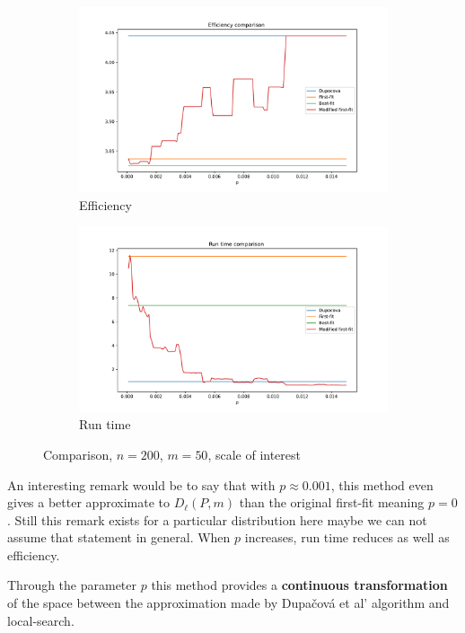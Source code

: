 \documentclass{amsart}
\begin{document}
\begin{figure}[ht]
    \centering
    \begin{subfigure}[b]{0.45\textwidth}
        \centering
        \includegraphics[width=1.1\textwidth]{plots/efficiency small scale p.pdf}
        \caption{Efficiency}
    \end{subfigure}
    \hfill
    \begin{subfigure}[b]{0.45\textwidth}
        \centering
        \includegraphics[width=1.1\textwidth]{plots/RUN TIME p small scale.pdf}
        \caption{Run time}
    \end{subfigure}
    \caption{Comparison, $n=200$, $m=50$, scale of interest}
    \label{p small scale}
\end{figure}

An interesting remark would be to say that with $p\approx 0.001$, this method even gives a better approximate to $D_\ell\left(P,m\right)$ than the original first-fit meaning $p=0$. Still this remark exists for a particular distribution here maybe we can not assume that statement in general. When $p$ increases, run time reduces as well as efficiency. 
\begin{remark}
    Through the parameter $p$ this method provides a \textbf{continuous transformation} of the space between the approximation made by Dupačová et al' algorithm and local-search. 
\end{remark}
\end{document}
